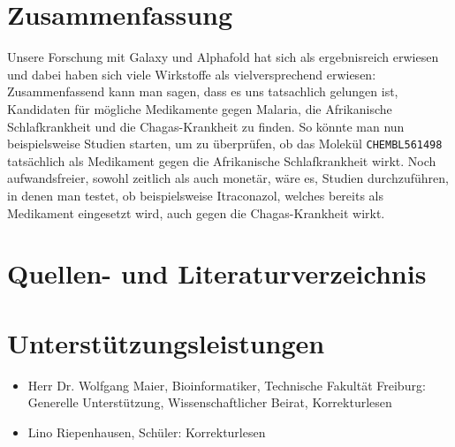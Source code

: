 \documentclass[10pt]{article}
\begin{document}
    \section{Zusammenfassung}\label{sec:zusammenfassung}
    Unsere Forschung mit Galaxy und Alphafold hat sich als ergebnisreich erwiesen und dabei haben sich viele
    Wirkstoffe als vielversprechend erwiesen: Zusammenfassend kann man sagen, dass es uns tatsachlich gelungen ist,
    Kandidaten für mögliche Medikamente gegen Malaria, die Afrikanische Schlafkrankheit und die Chagas-Krankheit zu
    finden.
    So könnte man nun beispielsweise Studien starten, um zu überprüfen, ob das Molekül \texttt{CHEMBL561498}
    tatsächlich als Medikament gegen die Afrikanische Schlafkrankheit wirkt.
    Noch aufwandsfreier, sowohl zeitlich als
    auch monetär, wäre es, Studien durchzuführen, in denen man testet, ob beispielsweise Itraconazol, welches bereits
    als Medikament eingesetzt wird, auch gegen die Chagas-Krankheit wirkt.

    \section{Quellen- und Literaturverzeichnis}\label{sec:quellen--und-literaturverzeichnis}
    

    \section{Unterstützungsleistungen}\label{sec:unterstuetzungsleistungen}

    \begin{itemize}
        \item Herr Dr. Wolfgang Maier, Bioinformatiker, Technische Fakultät Freiburg: Generelle Unterstützung,
        Wissenschaftlicher Beirat, Korrekturlesen

        \item Lino Riepenhausen, Schüler: Korrekturlesen
    \end{itemize}
\end{document}
